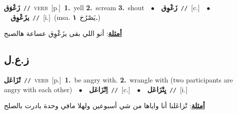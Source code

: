 \documentclass[10pt,a4paper,twoside]{article} %
\begin{document}
\begin{multicols}{2}
{\setlength\topsep{0pt}\textbf{\foreignlanguage{arabic}{زَعْوَق}}\ {\color{gray}\texttt{//}\color{black}}\ \textsc{verb}\ [p.]\ \textbf{1.}~yell  \textbf{2.}~scream  \textbf{3.}~shout\ \ $\bullet$\ \ \setlength\topsep{0pt}\textbf{\foreignlanguage{arabic}{زَعْوِق}}\ {\color{gray}\texttt{//}\color{black}}\ [c.]\ \ $\bullet$\ \ \setlength\topsep{0pt}\textbf{\foreignlanguage{arabic}{يزَعْوِق}}\ {\color{gray}\texttt{//}\color{black}}\ [i.]\ \color{gray}(msa. \foreignlanguage{arabic}{يَصْرُخ}~\foreignlanguage{arabic}{\textbf{١.}})\color{black}\  \begin{flushright}\color{gray}\foreignlanguage{arabic}{\textbf{\underline{\foreignlanguage{arabic}{أمثلة}}}: أنو اللي بقى يزَعْوِق عساعة هالصبح}\end{flushright}\color{black}} \vspace{2mm}

\vspace{-3mm}
\subsection*{\color{blue}\foreignlanguage{arabic}{ز.ع.ل}\color{blue}{}} 

{\setlength\topsep{0pt}\textbf{\foreignlanguage{arabic}{تْزَاعَل}}\ {\color{gray}\texttt{//}\color{black}}\ \textsc{verb}\ [p.]\ \textbf{1.}~be angry with.  \textbf{2.}~wrangle with (two participants are angry with each other)\ \ $\bullet$\ \ \setlength\topsep{0pt}\textbf{\foreignlanguage{arabic}{اِتْزَاعَل}}\ {\color{gray}\texttt{//}\color{black}}\ [c.]\ \ $\bullet$\ \ \setlength\topsep{0pt}\textbf{\foreignlanguage{arabic}{يِتْزَاعَل}}\ {\color{gray}\texttt{//}\color{black}}\ [i.]\  \begin{flushright}\color{gray}\foreignlanguage{arabic}{\textbf{\underline{\foreignlanguage{arabic}{أمثلة}}}: تْزاعَلنا أنا واياها من شي أسبوعين ولهلا مافي وحدة بادرت بالصلح}\end{flushright}\color{black}} \vspace{2mm}


\end{multicols}
\end{document}
